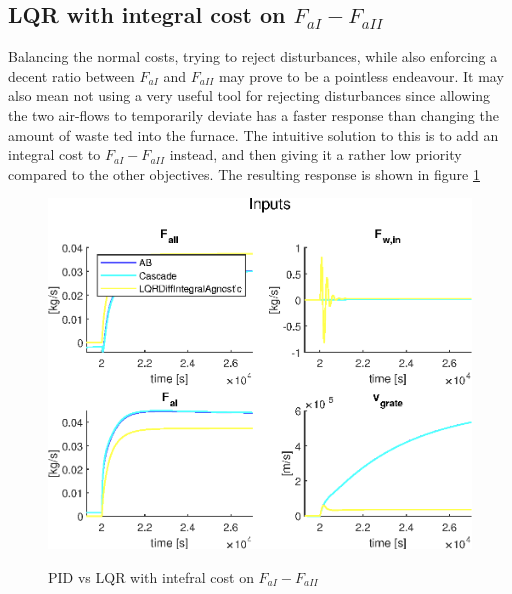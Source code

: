 \subsection{LQR with integral cost on \texorpdfstring{$F_{aI}-F_{aII}$}{TEXT}}
Balancing the normal costs, trying to reject disturbances, while also enforcing a decent ratio between $F_{aI}$ and $F_{aII}$ may prove to be a pointless endeavour. It may also mean not using a very useful tool for rejecting disturbances since allowing the two air-flows to temporarily deviate has a faster response than changing the amount of waste ted into the furnace. The intuitive solution to this is to add an integral cost to  $F_{aI}-F_{aII}$ instead, and then giving it a rather low priority compared to the other objectives. The resulting response is shown in figure \ref{fig:integrall_diff_cost_outputs}

\begin{figure}
    \includegraphics[width=\textwidth]{img/Fig_dump/outputs_ABCascadeLQRDiffIntegralAgnosticStep_Q_all.eps}
    \label{fig:integrall_diff_cost_outputs}
    \caption{PID vs LQR with intefral cost on $F_{aI} - F_{aII}$}
\end{figure}

